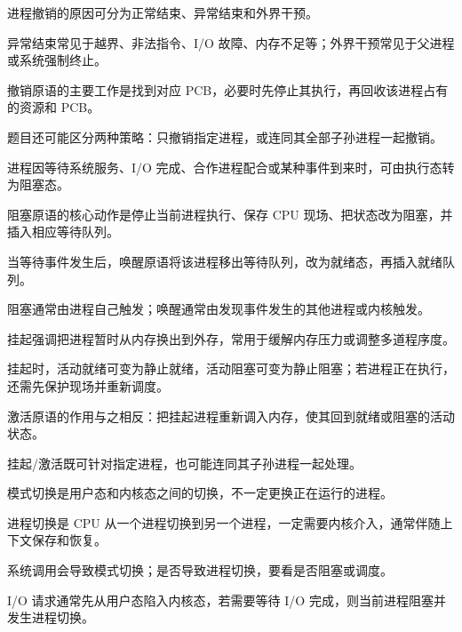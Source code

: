 \begin{points}
  \item 进程撤销的原因可分为正常结束、异常结束和外界干预。
  \item 异常结束常见于越界、非法指令、I/O 故障、内存不足等；外界干预常见于父进程或系统强制终止。
  \item 撤销原语的主要工作是找到对应 PCB，必要时先停止其执行，再回收该进程占有的资源和 PCB。
  \item 题目还可能区分两种策略：只撤销指定进程，或连同其全部子孙进程一起撤销。
\end{points}


\begin{points}
  \item 进程因等待系统服务、I/O 完成、合作进程配合或某种事件到来时，可由执行态转为阻塞态。
  \item 阻塞原语的核心动作是停止当前进程执行、保存 CPU 现场、把状态改为阻塞，并插入相应等待队列。
  \item 当等待事件发生后，唤醒原语将该进程移出等待队列，改为就绪态，再插入就绪队列。
  \item 阻塞通常由进程自己触发；唤醒通常由发现事件发生的其他进程或内核触发。
\end{points}


\begin{points}
  \item 挂起强调把进程暂时从内存换出到外存，常用于缓解内存压力或调整多道程序度。
  \item 挂起时，活动就绪可变为静止就绪，活动阻塞可变为静止阻塞；若进程正在执行，还需先保护现场并重新调度。
  \item 激活原语的作用与之相反：把挂起进程重新调入内存，使其回到就绪或阻塞的活动状态。
  \item 挂起/激活既可针对指定进程，也可能连同其子孙进程一起处理。
\end{points}


\begin{points}
  \item 模式切换是用户态和内核态之间的切换，不一定更换正在运行的进程。
  \item 进程切换是 CPU 从一个进程切换到另一个进程，一定需要内核介入，通常伴随上下文保存和恢复。
  \item 系统调用会导致模式切换；是否导致进程切换，要看是否阻塞或调度。
  \item I/O 请求通常先从用户态陷入内核态，若需要等待 I/O 完成，则当前进程阻塞并发生进程切换。
\end{points}


